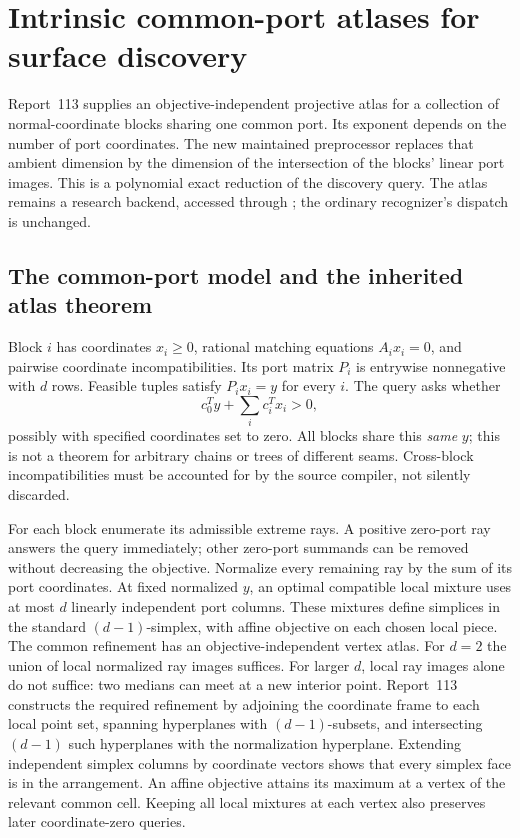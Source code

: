 \section{Intrinsic common-port atlases for surface discovery}
\label{sec:intrinsic-port-atlases}

Report~113 supplies an objective-independent projective atlas for a
collection of normal-coordinate blocks sharing one common port.  Its
exponent depends on the number of port coordinates.  The new maintained
preprocessor  replaces that ambient
dimension by the dimension of the intersection of the blocks' linear
port images.  This is a polynomial exact reduction of the discovery
query.  The atlas remains a research backend, accessed through
; the ordinary recognizer's
dispatch is unchanged.

\subsection{The common-port model and the inherited atlas theorem}

Block $i$ has coordinates $x_i\geq0$, rational matching equations
$A_i x_i=0$, and pairwise coordinate incompatibilities.  Its port matrix
$P_i$ is entrywise nonnegative with $d$ rows.  Feasible tuples satisfy
$P_i x_i=y$ for every $i$.  The query asks whether
\[
 c_0^T y+\sum_i c_i^T x_i>0,
\]
possibly with specified coordinates set to zero.  All blocks share this
\emph{same} $y$; this is not a theorem for arbitrary chains or trees of
different seams.  Cross-block incompatibilities must be accounted for by
the source compiler, not silently discarded.

For each block enumerate its admissible extreme rays.  A positive
zero-port ray answers the query immediately; other zero-port summands
can be removed without decreasing the objective.  Normalize every
remaining ray by the sum of its port coordinates.  At fixed normalized
$y$, an optimal compatible local mixture uses at most $d$ linearly
independent port columns.  These mixtures define simplices in the
standard $(d-1)$-simplex, with affine objective on each chosen local
piece.  The common refinement has an objective-independent vertex atlas.
For $d=2$ the union of local normalized ray images suffices.  For larger
$d$, local ray images alone do not suffice: two medians can meet at a
new interior point.  Report~113 constructs the required refinement by
adjoining the coordinate frame to each local point set, spanning
hyperplanes with $(d-1)$-subsets, and intersecting $(d-1)$ such
hyperplanes with the normalization hyperplane.  Extending independent
simplex columns by coordinate vectors shows that every simplex face is
in the arrangement.  An affine objective attains its maximum at a
vertex of the relevant common cell.  Keeping all local mixtures at
each vertex also preserves later coordinate-zero queries.


